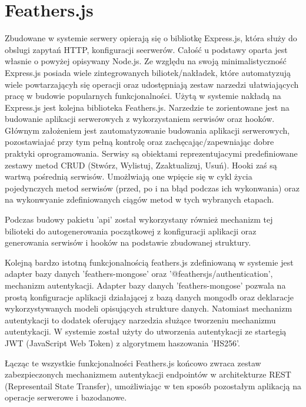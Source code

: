 \section{Feathers.js}
Zbudowane w systemie serwery opierają się o bibliotkę Express.js, która służy do obslugi zapytań HTTP, konfiguracji seerwerów. Całość u podstawy oparta jest własnie o powyżej opisywany Node.js. Ze względu na swoją minimalistyczność Express.js posiada wiele zintegrowanych biliotek/nakładek, które automatyzują wiele powtarzającyh się operacji oraz udostępniają zestaw narzedzi ułatwiających pracę w budowie popularnych funkcjonalności. Użytą w systemie nakładą na Express.js jest kolejna biblioteka Feathers.js. Narzedzie te zorientowane jest na budowanie aplikacji serwerowych z wykorzystaniem serwisów oraz hooków. Głównym założeniem jest zautomatyzowanie budowania aplikacji serwerowych, pozostawiajać przy tym pełną kontrolę oraz zachęcając/zapewniając dobre praktyki oprogramowania. Serwisy są obiektami reprezentujacymi predefiniowane zestawy metod CRUD (Stwórz, Wylistuj, Zzaktualizuj, Usuń). Hooki zaś są wartwą pośrednią serwisów. Umożlwiają one wpięcie się w cykl życia pojedynczych metod serwisów (przed, po i na błąd podczas ich wykonwania) oraz na wykonwyanie zdefiniowanych ciągów metod w tych wybranych etapach. 

Podczas budowy pakietu 'api' został wykorzystany również mechanizm tej bilioteki do autogenerowania początkowej z  konfiguracji aplikacji oraz generowania serwisów i hooków na podstawie zbudowanej struktury.

Kolejną bardzo istotną funkcjonalnością feathers.js zdefiniowaną w systemie jest adapter bazy danych 'feathers-mongose' oraz '@feathersjs/authentication', mechanizm autentykacji. Adapter bazy danych 'feathers-mongose' pozwala na prostą konfiguracje aplikacji działającej z bazą danych mongodb oraz deklaracje wykorzystywanych modeli opisujących strukture danych. Natomiast mechanizm autentykacji to dodatek oferujący narzedzia służące tworzeniu mechanizmu autentykacji. W systemie został użyty do utworzenia autentykacji ze startegią JWT (JavaScript Web Token) z algorytmem haszowania 'HS256'. 

Łącząc te wszystkie funkcjonalności Feathers.js końcowo zwraca zestaw zabezpieczonych mechanizmem autentykacji endpointów w architekturze REST (Representail State Transfer), umożliwiając w ten sposób pozostałym aplikacją na operacje serwerowe i bazodanowe.

